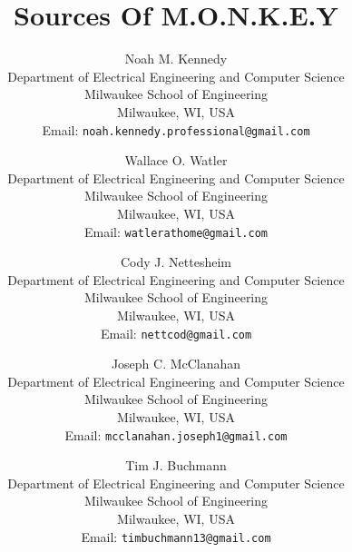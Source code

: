 \documentclass[8pt]{article}
\title{
    Sources Of M.O.N.K.E.Y
}
\author{
    Noah M. Kennedy \\[3pt]
    {\small Department of Electrical Engineering and Computer Science} \\
    {\small Milwaukee School of Engineering} \\
    {\small Milwaukee, WI, USA} \\
    {\small Email: {\texttt{noah.kennedy.professional@gmail.com} }} \\
    \and
    Wallace O. Watler \\[3pt]
    {\small Department of Electrical Engineering and Computer Science} \\
    {\small Milwaukee School of Engineering} \\
    {\small Milwaukee, WI, USA} \\
    {\small Email: {\texttt{watlerathome@gmail.com} }} \\
    \and
    Cody J. Nettesheim \\[3pt]
    {\small Department of Electrical Engineering and Computer Science} \\
    {\small Milwaukee School of Engineering} \\
    {\small Milwaukee, WI, USA} \\
    {\small Email: {\texttt{nettcod@gmail.com} }} \\
    \and
    Joseph C. McClanahan \\[3pt]
    {\small Department of Electrical Engineering and Computer Science} \\
    {\small Milwaukee School of Engineering} \\
    {\small Milwaukee, WI, USA} \\
    {\small Email: {\texttt{mcclanahan.joseph1@gmail.com} }} \\
    \and
    Tim J. Buchmann \\[3pt]
    {\small Department of Electrical Engineering and Computer Science} \\
    {\small Milwaukee School of Engineering} \\
    {\small Milwaukee, WI, USA} \\
    {\small Email: {\texttt{timbuchmann13@gmail.com} }}
}
\begin{document}
    \maketitle~\nocite{*}
    \newpage

    \printbibliography
\end{document}
